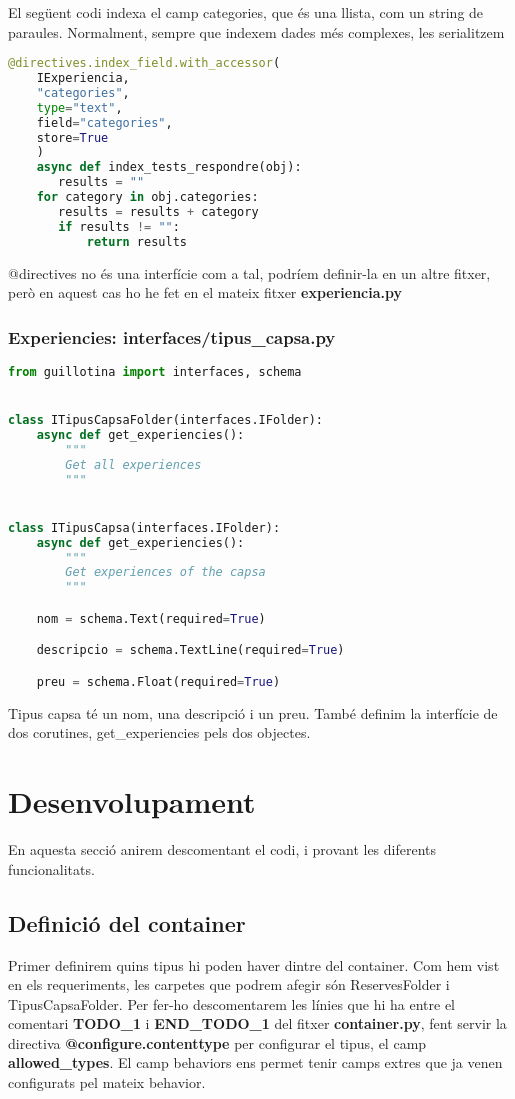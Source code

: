 \documentclass[a4paper, 11pt]{article}
\begin{document}
  El següent codi indexa el camp categories, que és una llista, com un
  string de paraules. Normalment, sempre que indexem dades més
  complexes, les serialitzem
  \begin{lstlisting}[language=Python, caption=Estructura dades]
  @directives.index_field.with_accessor(
    IExperiencia,
    "categories",
    type="text",
    field="categories",
    store=True
    )
    async def index_tests_respondre(obj):
       results = ""
    for category in obj.categories:
       results = results + category
       if results != "":
           return results
         \end{lstlisting}
         @directives no és una interfície com a tal, podríem
         definir-la en un altre fitxer, però en aquest cas ho he fet
         en el mateix fitxer \textbf{experiencia.py}

\subsubsection{Experiencies: interfaces/tipus\_capsa.py}
    \begin{lstlisting}[language=Python, caption=Estructura dades]
  from guillotina import interfaces, schema


class ITipusCapsaFolder(interfaces.IFolder):
    async def get_experiencies():
        """
        Get all experiences
        """


class ITipusCapsa(interfaces.IFolder):
    async def get_experiencies():
        """
        Get experiences of the capsa
        """

    nom = schema.Text(required=True)

    descripcio = schema.TextLine(required=True)

    preu = schema.Float(required=True)
  \end{lstlisting}

  Tipus capsa té un nom, una descripció i un preu. També definim la
  interfície de dos corutines, get\_experiencies pels dos objectes.


\pagebreak

\section{Desenvolupament}
En aquesta secció anirem descomentant el codi, i provant les diferents
funcionalitats.
\subsection{Definició del container}
Primer definirem quins tipus hi poden haver dintre del container. Com
hem vist en els requeriments, les carpetes que podrem afegir són
ReservesFolder i TipusCapsaFolder. Per fer-ho descomentarem les línies
que hi ha entre el comentari \textbf{TODO\_1} i \textbf{END\_TODO\_1}
del fitxer \textbf{container.py}, fent servir la directiva
\textbf{@configure.contenttype} per configurar el tipus, el camp
\textbf{allowed\_types}. El camp behaviors ens permet tenir camps
extres que ja venen configurats pel mateix behavior.
\end{document}
